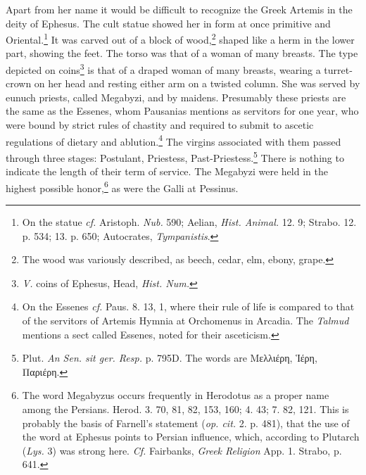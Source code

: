 \documentclass[a4paper, 12pt, oneside]{article}
\begin{document}
Apart from her name it would be difficult to recognize the Greek Artemis in the deity of Ephesus. The cult statue showed her in form at once primitive and Oriental.\footnote{On the statue \emph{cf.} Aristoph. \emph{Nub.} 590; Aelian, \emph{Hist. Animal.} 12. 9; Strabo. 12. p. 534; 13. p. 650; Autocrates, \emph{Tympanistis}.} It was carved out of a block of wood,\footnote{The wood was variously described, as beech, cedar, elm, ebony, grape.} shaped like a herm in the lower part, showing the feet. The torso was that of a woman of many breasts. The type depicted on coins\footnote{\emph{V.} coins of Ephesus, Head, \emph{Hist. Num.}} is that of a draped woman of many breasts, wearing a turret-crown on her head and resting either arm on a twisted column. She was served by eunuch priests, called Megabyzi, and by maidens. Presumably these priests are the same as the Essenes, whom Pausanias mentions as servitors for one year, who were bound by strict rules of chastity and required to submit to ascetic regulations of dietary and ablution.\footnote{On the Essenes \emph{cf.} Paus. 8. 13, 1, where their rule of life is compared to that of the servitors of Artemis Hymnia at Orchomenus in Arcadia. The \emph{Talmud} mentions a sect called Essenes, noted for their asceticism.} The virgins associated with them passed through three stages: Postulant, Priestess, Past-Priestess.\footnote{Plut. \emph{An Sen. sit ger. Resp.} p. 795D. The words are Μελλιέρη, Ἱέρη, Παριέρη.} There is nothing to indicate the length of their term of service. The Megabyzi were held in the highest possible honor,\footnote{The word Megabyzus occurs frequently in Herodotus as a proper name among the Persians. Herod. 3. 70, 81, 82, 153, 160; 4. 43; 7. 82, 121. This is probably the basis of Farnell's statement (\emph{op. cit.} 2. p. 481), that the use of the word at Ephesus points to Persian influence, which, according to Plutarch (\emph{Lys.} 3) was strong here. \emph{Cf.} Fairbanks, \emph{Greek Religion} App. 1. Strabo, p. 641.} as were the Galli at Pessinus.
\end{document}
